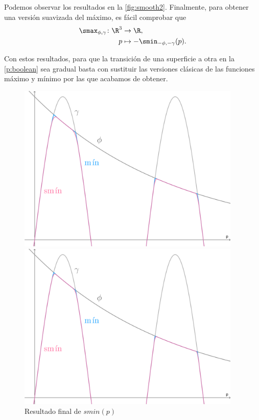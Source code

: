 Podemos observar los resultados en la \autoref{fig:smooth2}. Finalmente, para obtener una versión suavizada del máximo, es fácil comprobar que 
\begin{align*}
      \smax_{\phi,\gamma}\colon \R^3&\to \R,\\
      p &\mapsto -\smin_{-\phi,-\gamma}(p).
\end{align*}

Con estos resultados, para que la transición de una superficie a otra en la \autoref{p:boolean} sea gradual basta con sustituir las versiones clásicas de las funciones máximo y mínimo por las que acabamos de obtener.  
\begin{figure}[!h]
     \begin{minipage}[c]{0.49\linewidth}
        \centering
        \includegraphics[width=0.95\textwidth]{Plantilla-TFG-master/img/smin_3.png}
        \caption{$k=0.1,\ n=2$}
     \end{minipage}
     \begin{minipage}[c]{0.49\linewidth}
        \centering
        \includegraphics[width=0.95\textwidth]{Plantilla-TFG-master/img/smin_4.png}
        \caption{$k=0.1,\ n=3$}
     \end{minipage}
     \caption{Resultado final de $smin(p)$ }
     \label{fig:smooth2}
\end{figure}





